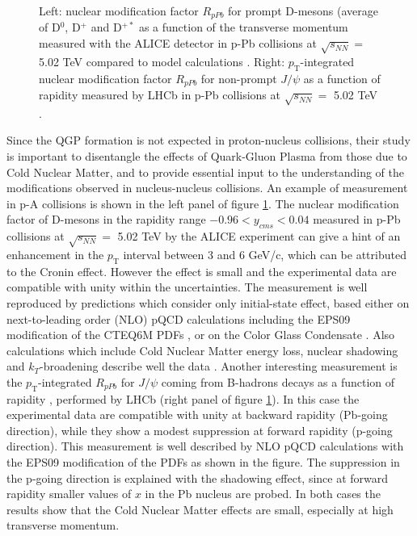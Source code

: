 \documentclass[b5paper,10pt,twoside,oldstyle,classica]{toptesi}
\newcommand{\pt}{p_\text{T}}
\begin{document}
\begin{figure}[tb]
\begin{center}
\caption{Left: nuclear modification factor $R_{pPb}$ for prompt D-mesons (average of D$^0$, D$^+$ and D$^{+*}$ as a function of the transverse momentum measured with the ALICE detector in p-Pb collisions at $\sqrt{s_{NN}} =$ 5.02 TeV compared to model calculations \cite{Abelev:2014hha}. Right: $\pt$-integrated nuclear modification factor $R_{pPb}$ for non-prompt $J/\psi$ as a function of rapidity measured by LHCb in p-Pb collisions at $\sqrt{s_{NN}} =$ 5.02 TeV \cite{Aaij:2013zxa}.}
\label{RpPb}
\end{center}
\end{figure}
Since the QGP formation is not expected in proton-nucleus collisions, their study is important to disentangle the effects of Quark-Gluon Plasma from those due to Cold Nuclear Matter, and to provide essential input to the understanding of the modifications observed in nucleus-nucleus collisions. An example of measurement in p-A collisions is shown in the left panel of figure \ref{RpPb}. The nuclear modification factor of D-mesons in the rapidity range $-0.96< y_{cms}<0.04$ measured in p-Pb collisions at $\sqrt{s_{NN}} =$ 5.02 TeV by the ALICE experiment \cite{Abelev:2014hha} can give a hint of an enhancement in the $\pt$ interval between 3 and 6 GeV/c, which can be attributed to the Cronin effect. However the effect is small and the experimental data are compatible with unity within the uncertainties.
The measurement is well reproduced by predictions which consider only initial-state effect, based either on next-to-leading order (NLO) pQCD calculations \cite{Mangano:1991jk} including the EPS09 modification of the CTEQ6M PDFs \cite{Eskola:2009uj}, or on the Color Glass Condensate \cite{Stump:2003yu}. Also calculations which include Cold Nuclear Matter energy loss, nuclear shadowing and $k_T$-broadening describe well the data \cite{Fujii:2013yja}. Another interesting measurement is the $\pt$-integrated $R_{pPb}$ for $J/\psi$ coming from B-hadrons decays as a function of rapidity \cite{Aaij:2013zxa}, performed by LHCb (right panel of figure \ref{RpPb}). In this case the experimental data are compatible with unity at backward rapidity (Pb-going direction), while they show a modest suppression at forward rapidity (p-going direction). This measurement is well described by NLO pQCD calculations with the EPS09 modification of the PDFs as shown in the figure. The suppression in the p-going direction is explained with the shadowing effect, since at forward rapidity smaller values of $x$ in the Pb nucleus are probed.
In both cases the results show that the Cold Nuclear Matter effects are small, especially at high transverse momentum.  
\end{document}

